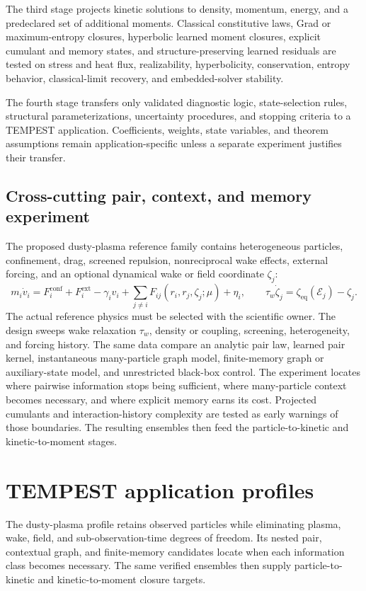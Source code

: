 \documentclass[11pt]{article}
\begin{document}
The third stage projects kinetic solutions to density, momentum, energy, and a
predeclared set of additional moments. Classical constitutive laws, Grad or
maximum-entropy closures, hyperbolic learned moment closures, explicit
cumulant and memory states, and structure-preserving learned residuals are
tested on stress and heat flux, realizability, hyperbolicity, conservation,
entropy behavior, classical-limit recovery, and embedded-solver stability.

The fourth stage transfers only validated diagnostic logic, state-selection
rules, structural parameterizations, uncertainty procedures, and stopping
criteria to a TEMPEST application. Coefficients, weights, state variables, and
theorem assumptions remain application-specific unless a separate experiment
justifies their transfer.

\subsection{Cross-cutting pair, context, and memory experiment}
The proposed dusty-plasma reference family contains heterogeneous particles,
confinement, drag, screened repulsion, nonreciprocal wake effects, external
forcing, and an optional dynamical wake or field coordinate $\zeta_j$:
\begin{equation}
  m_i\dot v_i=F_i^{\mathrm{conf}}+F_i^{\mathrm{ext}}-\gamma_i v_i
  +\sum_{j\ne i}F_{ij}(r_i,r_j,\zeta_j;\mu)+\eta_i,
  \qquad
  \tau_w\dot\zeta_j=\zeta_{\mathrm{eq}}(\mathcal E_j)-\zeta_j.
\end{equation}
The actual reference physics must be selected with the scientific owner. The
design sweeps wake relaxation $\tau_w$, density or coupling, screening,
heterogeneity, and forcing history. The same data compare an analytic pair
law, learned pair kernel, instantaneous many-particle graph model,
finite-memory graph or auxiliary-state model, and unrestricted black-box
control. The experiment locates where pairwise information stops being
sufficient, where many-particle context becomes necessary, and where explicit
memory earns its cost. Projected cumulants and interaction-history complexity
are tested as early warnings of those boundaries. The resulting ensembles
then feed the particle-to-kinetic and kinetic-to-moment stages.

\section{TEMPEST application profiles}
The dusty-plasma profile retains observed particles while eliminating plasma,
wake, field, and sub-observation-time degrees of freedom. Its nested pair,
contextual graph, and finite-memory candidates locate when each information
class becomes necessary. The same verified ensembles then supply
particle-to-kinetic and kinetic-to-moment closure targets.
\end{document}
